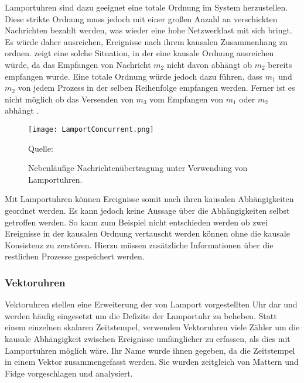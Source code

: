 Lamportuhren sind dazu geeignet eine totale Ordnung im System herzustellen.
Diese strikte Ordnung muss jedoch mit einer großen Anzahl an verschickten Nachrichten bezahlt werden, was wieder eine hohe Netzwerklast mit sich bringt.
Es würde daher ausreichen, Ereignisse nach ihrem kausalen Zusammenhang zu ordnen.
 zeigt eine solche Situation, in der eine kausale Ordnung ausreichen würde, da das Empfangen von Nachricht $m_2$ nicht davon abhängt ob $m_2$ bereits empfangen wurde.
Eine totale Ordnung würde jedoch dazu führen, dass $m_1$ und $m_2$ von jedem Prozess in der selben Reihenfolge empfangen werden.
Ferner ist es nicht möglich ob das Versenden von $m_3$ vom Empfangen von $m_1$ oder $m_2$ abhängt \cite{Tanenbaum2007}.

\begin{figure}[ht]
    \centering
    \texttt{[image: LamportConcurrent.png]}
    \caption[Lamportuhren und Kausalität]{Nebenläufige Nachrichtenübertragung unter Verwendung von Lamportuhren.}
    Quelle: \cite{Tanenbaum2007}
    \label{fig:LamportConcurrent}
\end{figure}

Mit Lamportuhren können Ereignisse somit nach ihren kausalen Abhängigkeiten geordnet werden.
Es kann jedoch keine Aussage über die Abhängigkeiten selbst getroffen werden.
So kann zum Beispiel nicht entschieden werden ob zwei Ereignisse in der kausalen Ordnung vertauscht werden können ohne die kausale Konsistenz zu zerstören.
Hierzu müssen zusätzliche Informationen über die restlichen Prozesse gespeichert werden.

\subsubsection{Vektoruhren}
Vektoruhren stellen eine Erweiterung der von Lamport vorgestellten Uhr dar und werden häufig eingesetzt um die Defizite der Lamportuhr zu beheben.
Statt einem einzelnen skalaren Zeitstempel, verwenden Vektoruhren viele Zähler um die kausale Abhängigkeit zwischen Ereignisse umfänglicher zu erfassen, als dies mit Lamportuhren möglich wäre.
Ihr Name wurde ihnen gegeben, da die Zeitstempel in einem Vektor zusammengefasst werden.
Sie wurden zeitgleich von Mattern \cite{mattern1989virtual} und Fidge \cite{fidge1991logical, fidge1988timestamps} vorgeschlagen und analysiert.


